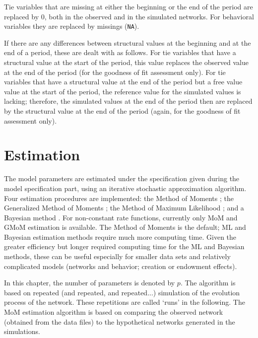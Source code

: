 \documentclass[a4paper,fleqn,11pt]{article}
\newcommand{\+}{\, + \,}
\begin{document}
Tie variables that are missing at either the beginning or the end of the period
are replaced by 0, both in the observed and in the simulated networks.
For behavioral variables they are replaced by missings (\texttt{NA}).

If there are any differences between structural values at the beginning and
at the end of a period, these are dealt with as follows.
For tie variables that have a structural value at the start of the period,
this value replaces the observed value at the end of the period
(for the goodness of fit assessment only).
For tie variables that have a structural value at the end of the period
but a free value value at the start of the period, the reference value for
the simulated values is lacking; therefore, the simulated values at the end
of the period then are replaced by the structural value at the end of the period
(again, for the goodness of fit assessment only).


\newpage

\section{Estimation}
\label{S_Est}

The model parameters are estimated under the specification given
during the model specification part, using an iterative stochastic
approximation algorithm.
Four estimation procedures are implemented:
the Method of Moments \citep*[`MoM';][]{Snijders01, SnijdersEA07};
the Generalized Method of Moments \citep*[`GMoM';][]{ASS2015,ASS2019};
 the Method of Maximum Likelihood \citep[`ML';][]{SnijdersEA10a};
 and a Bayesian method
 \citep{Koskinen04, KoskinenSnijders07,SchweinbergerSnijders07c}.
 For non-constant rate functions, currently only
 MoM and GMoM estimation is available.
 The Method of Moments is the default;
 ML and Bayesian estimation methods require much more computing time.
 Given the greater efficiency but longer required computing time
 for the ML and Bayesian methods,
 these can be useful especially for smaller data sets
 and relatively complicated models
 (networks and behavior; creation or endowment effects).

In this chapter, the number of
parameters is denoted by $p$. The algorithm is based on repeated
(and repeated, and repeated...) simulation of the evolution
process of the network. These repetitions are called `runs' in the
following. The MoM estimation algorithm is based on comparing the
observed network (obtained from the data files)
to the hypothetical networks generated in the simulations.
\end{document}
